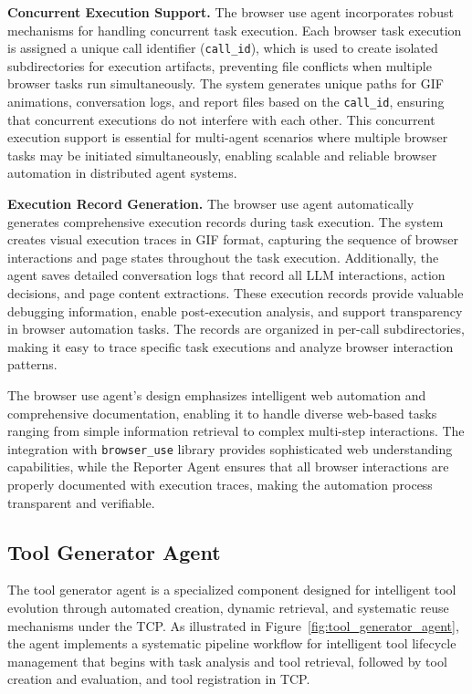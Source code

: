 \documentclass[11pt]{article}
\begin{document}
\textbf{Concurrent Execution Support.} The browser use agent incorporates robust mechanisms for handling concurrent task execution. Each browser task execution is assigned a unique call identifier (\texttt{call\_id}), which is used to create isolated subdirectories for execution artifacts, preventing file conflicts when multiple browser tasks run simultaneously. The system generates unique paths for GIF animations, conversation logs, and report files based on the \texttt{call\_id}, ensuring that concurrent executions do not interfere with each other. This concurrent execution support is essential for multi-agent scenarios where multiple browser tasks may be initiated simultaneously, enabling scalable and reliable browser automation in distributed agent systems.

\textbf{Execution Record Generation.} The browser use agent automatically generates comprehensive execution records during task execution. The system creates visual execution traces in GIF format, capturing the sequence of browser interactions and page states throughout the task execution. Additionally, the agent saves detailed conversation logs that record all LLM interactions, action decisions, and page content extractions. These execution records provide valuable debugging information, enable post-execution analysis, and support transparency in browser automation tasks. The records are organized in per-call subdirectories, making it easy to trace specific task executions and analyze browser interaction patterns.

The browser use agent's design emphasizes intelligent web automation and comprehensive documentation, enabling it to handle diverse web-based tasks ranging from simple information retrieval to complex multi-step interactions. The integration with \texttt{browser\_use} library provides sophisticated web understanding capabilities, while the Reporter Agent ensures that all browser interactions are properly documented with execution traces, making the automation process transparent and verifiable.

\subsection{Tool Generator Agent}
\label{app_sec:tool_generator_agent}

The tool generator agent is a specialized component designed for intelligent tool evolution through automated creation, dynamic retrieval, and systematic reuse mechanisms under the TCP. As illustrated in Figure~\ref{fig:tool_generator_agent}, the agent implements a systematic pipeline workflow for intelligent tool lifecycle management that begins with task analysis and tool retrieval, followed by tool creation and evaluation, and tool registration in TCP.
\end{document}
